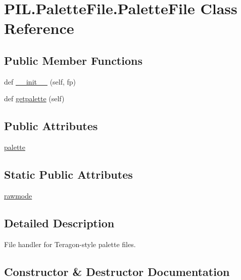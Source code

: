 \hypertarget{classPIL_1_1PaletteFile_1_1PaletteFile}{}\section{P\+I\+L.\+Palette\+File.\+Palette\+File Class Reference}
\label{classPIL_1_1PaletteFile_1_1PaletteFile}
\subsection*{Public Member Functions}
\begin{DoxyCompactItemize}
\item 
def \hyperlink{classPIL_1_1PaletteFile_1_1PaletteFile_a9c354456a06df2231e73a41c54ee4b93}{\+\_\+\+\_\+init\+\_\+\+\_\+} (self, fp)
\item 
def \hyperlink{classPIL_1_1PaletteFile_1_1PaletteFile_a2b709e7613c05c93e000dda3b0b779f5}{getpalette} (self)
\end{DoxyCompactItemize}
\subsection*{Public Attributes}
\begin{DoxyCompactItemize}
\item 
\hyperlink{classPIL_1_1PaletteFile_1_1PaletteFile_ad885c2cdf1ca24c885b8202f7c4ac32f}{palette}
\end{DoxyCompactItemize}
\subsection*{Static Public Attributes}
\begin{DoxyCompactItemize}
\item 
\hyperlink{classPIL_1_1PaletteFile_1_1PaletteFile_a5b174f18890bfaa897b7b30cc07cba08}{rawmode}
\end{DoxyCompactItemize}


\subsection{Detailed Description}
\begin{DoxyVerb}File handler for Teragon-style palette files.\end{DoxyVerb}
 

\subsection{Constructor \& Destructor Documentation}
\mbox{\label{classPIL_1_1PaletteFile_1_1PaletteFile_a9c354456a06df2231e73a41c54ee4b93}} 
